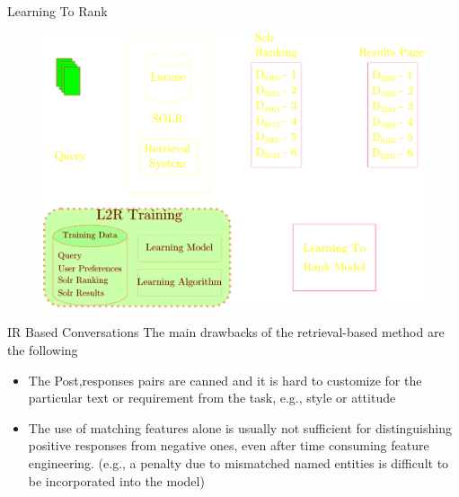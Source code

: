 %
%
%

\begin{frame}{Learning To Rank}
\begin{figure}
	\centering
	\includegraphics[width=0.7\linewidth]{./Images/LearningToRank}
	\label{fig:learningtorank}
\end{figure}

\end{frame}
\begin{frame}{IR Based Conversations}
The main drawbacks of the retrieval-based method are the following
\begin{itemize}
	\item The Post,responses pairs are canned and it is hard to customize for the particular text or requirement from the task, e.g., style or attitude
	\item The use of matching features alone is usually not sufficient for distinguishing positive responses from negative ones, even after time consuming feature engineering.  (e.g., a penalty due to mismatched named entities is difficult to be incorporated into the model)
\end{itemize}

\end{frame}
